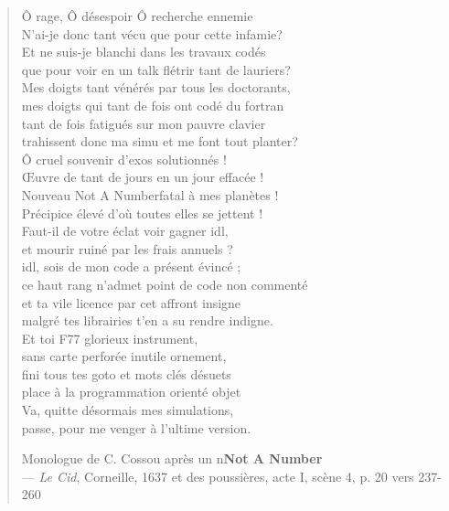 \begin{quote}
\og Ô rage, Ô désespoir Ô recherche ennemie\\
N'ai-je donc tant vécu que pour cette infamie?\\
Et ne suis-je blanchi dans les travaux codés\\
que pour voir en un talk flétrir tant de lauriers? \\
Mes doigts tant vénérés par tous les doctorants, \\
mes doigts qui tant de fois ont codé du fortran\\
tant de fois fatigués sur mon pauvre clavier\\
trahissent donc ma simu et me font tout planter? \\
Ô cruel souvenir d'exos solutionnés !\\
Œuvre de tant de jours en un jour effacée !\\
Nouveau \og Not A Number\fg fatal à mes planètes !\\
Précipice élevé d'où toutes elles se jettent !\\
Faut-il de votre éclat voir gagner idl, \\
et mourir ruiné par les frais annuels ? \\
idl, sois de mon code a présent évincé ; \\
ce haut rang n'admet point de code non commenté\\
et ta vile licence par cet affront insigne\\
malgré tes librairies t'en a su rendre indigne. \\
Et toi F77 glorieux instrument, \\
sans carte perforée inutile ornement, \\
fini tous tes goto et mots clés désuets\\
place à la programmation orienté objet\\
Va, quitte désormais mes simulations,\\
passe, pour me venger à l'ultime version.\fg

Monologue de C. Cossou après un n\ieme \textbf{Not A Number}\\
  --- \textit{Le Cid}, Corneille, 1637 et des poussières, acte I, scène 4, p. 20 vers 237-260
\end{quote}